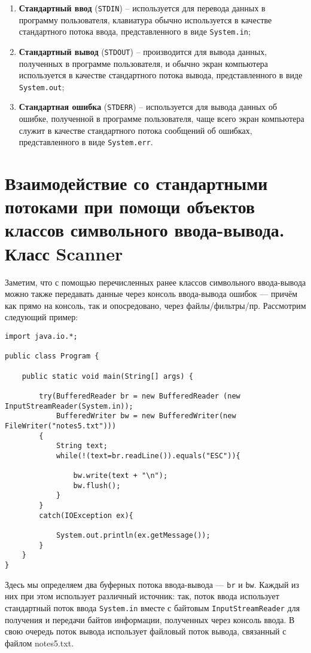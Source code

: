 \documentclass{report}
\begin{document}
\begin{enumerate}
    \item \textbf{Стандартный ввод} (\verb|STDIN|) – используется для перевода данных в программу пользователя, клавиатура обычно используется в качестве стандартного потока ввода, представленного в виде \verb|System.in|;
    \item \textbf{Стандартный вывод} (\verb|STDOUT|) – производится для вывода данных, полученных в программе пользователя, и обычно экран компьютера используется в качестве стандартного потока вывода, представленного в виде \verb|System.out|;
    \item \textbf{Стандартная ошибка} (\verb|STDERR|) – используется для вывода данных об ошибке, полученной в программе пользователя, чаще всего экран компьютера служит в качестве стандартного потока сообщений об ошибках, представленного в виде \verb|System.err|.
\end{enumerate}

\section{Взаимодействие со стандартными потоками при помощи объектов классов символьного ввода-вывода. Класс Scanner}

Заметим, что с помощью перечисленных ранее классов символьного ввода-вывода можно также передавать данные через консоль ввода-вывода ошибок — причём как прямо на консоль, так и опосредовано, через файлы/фильтры/пр. Рассмотрим следующий пример:

\begin{lstlisting}
import java.io.*;
 
public class Program {
 
    public static void main(String[] args) {
         
        try(BufferedReader br = new BufferedReader (new InputStreamReader(System.in)); 
            BufferedWriter bw = new BufferedWriter(new FileWriter("notes5.txt")))
        {
            String text;
            while(!(text=br.readLine()).equals("ESC")){
                  
                bw.write(text + "\n");
                bw.flush();
            }
        }
        catch(IOException ex){
              
            System.out.println(ex.getMessage());
        } 
    }   
}
\end{lstlisting}

Здесь мы определяем два буферных потока ввода-вывода — \verb|br| и \verb|bw|. Каждый из них при этом использует различный источник: так, поток ввода использует стандартный поток ввода \verb|System.in| вместе с байтовым \verb|InputStreamReader| для получения и передачи байтов информации, полученных через консоль ввода. В свою очередь поток вывода использует файловый поток вывода, связанный с файлом notes5.txt.
\end{document}
